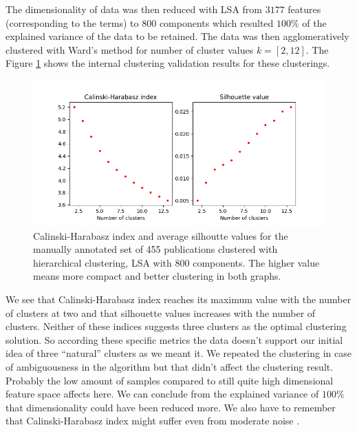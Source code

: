 The dimensionality of data was then reduced with LSA from $3177$
features (corresponding to the terms) to $800$ components which 
resulted $100\%$ of the explained variance of the data to be 
retained. The data was then agglomeratively clustered with Ward's 
method for number of cluster values $k=[2,12]$. 
The Figure \ref{fig:ch-silh01} shows the internal clustering 
validation results for these clusterings. 
\begin{figure}[ht]
  \begin{center}    
\includegraphics[width=11.5cm]{images/c-h-silh-index-plot-455-2_12-800-hierarchical.png}
    \caption{Calinski-Harabasz index and average silhoutte values for the
    manually annotated set of 455 publications clustered with 
    hierarchical clustering, LSA with 800 components. The higher 
    value means more compact and better clustering in both 
    graphs.}
    \label{fig:ch-silh01}
    \end{center}
\end{figure}
We see that Calinski-Harabasz index reaches its maximum value 
with the number of clusters at two and that silhouette values 
increases with the number of clusters.
Neither of these indices suggests three clusters as the optimal 
clustering solution. So according these specific metrics the data 
doesn't support our initial idea of three ``natural'' clusters as
we meant it. We repeated the clustering in case of ambiguousness
in the algorithm but that didn't affect the clustering result.
Probably the low amount of samples compared to 
still quite high dimensional feature space affects here. We can 
conclude from the explained variance of $100\%$ that dimensionality
could have been reduced more. We also 
have to remember that Calinski-Harabasz index might suffer even 
from moderate noise \cite{liu_understanding_2010}.

